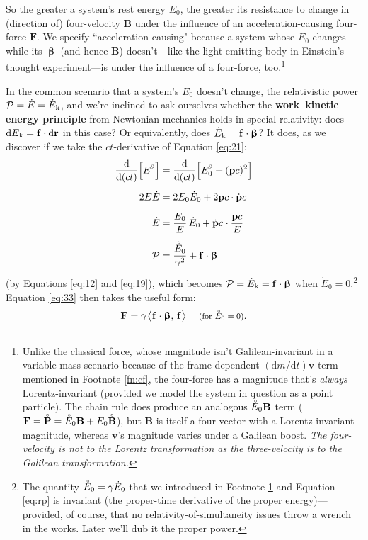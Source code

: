 \documentclass[12pt]{article}
\renewcommand{\mathring}[1]{\accentset{\circ}{#1}}
\renewcommand{\vv}[1]{\mathbf{#1}}
\newcommand{\dd}[1]{\mathrm{d}#1}
\newcommand{\vvbeta}{\bm{\upbeta}}
\begin{document}
So the greater a system's rest energy $E_0$, the greater its resistance to change in (direction of) four-velocity $\vv B$ under the influence of an acceleration-causing four-force $\vv F$. We specify ``acceleration-causing" because a system whose $E_0$ changes while its $\vvbeta$ (and hence $\vv B$) doesn't---like the light-emitting body in Einstein's thought experiment---is under the influence of a four-force, too.\footnote{\label{fn:fo}Unlike the classical force, whose magnitude isn't Galilean-invariant in a variable-mass scenario because of the frame-dependent $(\dd m / \dd t) \vv v$ term mentioned in Footnote \ref{fn:cf}, the four-force has a magnitude that's \emph{always} Lorentz-invariant (provided we model the system in question as a point particle). The chain rule does produce an analogous $\mathring{E}_0 \vv B$ term ($\vv F = \mathring{\vv P} = \mathring{E}_0 \vv B + E_0 \mathring{\vv B}$), but $\vv B$ is itself a four-vector with a Lorentz-invariant magnitude, whereas $\vv v$'s magnitude varies under a Galilean boost. \emph{The four-velocity is \emph{not} to the Lorentz transformation as the three-velocity is to the Galilean transformation.}}

In the common scenario that a system's $E_0$ doesn't change, the relativistic power $\mathcal{P} = \dot{E} = \dot{E}_{\mkern.5mu \textrm{k}}$, and we're inclined to ask ourselves whether the \textbf{work--kinetic energy principle} from Newtonian mechanics holds in special relativity: does $\dd E_{\mkern.5mu \textrm{k}} = \vv f \cdot \dd \vv r$ in this case? Or equivalently, does $\dot{E}_{\mkern.5mu \textrm{k}} = \vv f \cdot \vvbeta$? It does, as we discover if we take the $ct$-derivative of Equation \ref{eq:21}:
\begin{equation}\label{eq:rp}
\begin{split}
\frac{\dd}{\dd (ct)} \Big[ E^2 \Big] &= \frac{\dd}{\dd (ct)} \Big[ E_0^2 + (\vv p c)^2 \Big] \\[5pt]
2E \dot{E} &= 2 E_0 \dot{E}_0 + 2 \vv p c \cdot \dot{\vv p} c\\[5pt]
\dot{E} &= \dfrac{E_0}{E} \, \dot{E}_0 + \dot{\vv p} c \mkern1mu \cdot \dfrac{\vv p c}{E} \\[5pt]
\mathcal{P} &= \dfrac{\mathring{E}_0}{\gamma^2} + \vv f \cdot \vvbeta
\end{split}
\end{equation}
(by Equations \ref{eq:12} and \ref{eq:19}), which becomes $\mathcal{P} = \dot{E}_{\mkern.5mu \textrm{k}} = \vv f \cdot \vvbeta$ when $\dot{E}_0 = 0$.\footnote{The quantity $\mathring{E}_0 = \gamma \dot{E}_0$ that we introduced in Footnote \ref{fn:fo} and Equation \ref{eq:rp} is invariant (the proper-time derivative of the proper energy)---provided, of course, that no relativity-of-simultaneity issues throw a wrench in the works. Later we'll dub it the proper power.} Equation \ref{eq:33} then takes the useful form:
\begin{equation}\label{eq:fb}
\vv F = \gamma \mkern1.5mu \big \langle \vv f \cdot \vvbeta, \, \vv f \big \rangle \quad \textrm{\footnotesize{ (for $\mathring{E}_0 = 0$)}}.
\end{equation}
\end{document}
